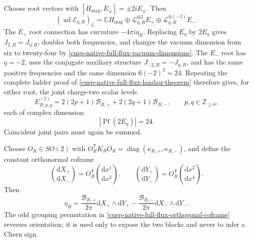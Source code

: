 Choose root vectors with
\([H_{\mathrm{mag}},E_\pm]=\pm2iE_\pm\).  Then
\begin{equation}
 (\operatorname{ad}\mathscr E_{\eta,R})_{\mathbb C}
 =\underline{\mathbb C}H_{\mathrm{mag}}
 \oplus\mathscr L_{\eta,R}^{\otimes2}E_+
 \oplus\mathscr L_{\eta,R}^{\otimes(-2)}E_-.
 \label{cusp-native-full-flux-root-decomposition}
\end{equation}
The \(E_+\) root connection has curvature \(-4\pi i\eta_R\).  Replacing
\(E_\eta\) by \(2E_\eta\) gives \(J_{2,R}=J_{\eta,R}\), doubles both
frequencies, and changes the vacuum dimension from six to twenty-four by
\cref{cusp-native-full-flux-vacuum-dimensions}.  The \(E_-\) root has
\(q=-2\), uses the conjugate auxiliary structure
\(J_{-2,R}=-J_{\eta,R}\), and has the same positive frequencies and the same
dimension \(6(-2)^2=24\).  Repeating the complete ladder proof of
\cref{cusp-native-full-flux-landau-theorem} therefore gives, for either root,
the joint charge-two scalar levels
\begin{equation}
 E^{(2)}_{R;p,q}
 =2(2p+1)\mathcal B_{R,+}+2(2q+1)\mathcal B_{R,-},
 \qquad p,q\in\mathbb Z_{\ge0},
 \label{cusp-native-full-flux-charge-two-levels}
\end{equation}
each of complex dimension
\begin{equation}
 |\operatorname{Pf}(2E_\eta)|=24.
 \label{cusp-native-full-flux-charge-two-multiplicity}
\end{equation}
Coincident joint pairs must again be summed.

Choose \(O_R\in SO(2)\) with
\(O_R^{\mathsf T}K_RO_R=\operatorname{diag}(\kappa_{R,+},\kappa_{R,-})\),
and define the constant orthonormal coframe
\begin{equation}
 \binom{\mathrm dX_+}{\mathrm dX_-}
 =O_R^{\mathsf T}\binom{\mathrm dx^1}{\mathrm dx^3},
 \qquad
 \binom{\mathrm dY_+}{\mathrm dY_-}
 =O_R^{\mathsf T}\binom{\mathrm dx^2}{\mathrm dx^4}.
 \label{cusp-native-full-flux-orthogonal-coframe}
\end{equation}
Then
\begin{equation}
 \eta_R=\frac{\mathcal B_{R,+}}{2\pi}
          \mathrm dX_+\wedge\mathrm dY_+
         -\frac{\mathcal B_{R,-}}{2\pi}
          \mathrm dX_-\wedge\mathrm dY_-.
 \label{cusp-native-full-flux-normal-form}
\end{equation}
The odd grouping permutation in
\cref{cusp-native-full-flux-orthogonal-coframe} reverses orientation; it is
used only to expose the two blocks and never to infer a Chern sign.

